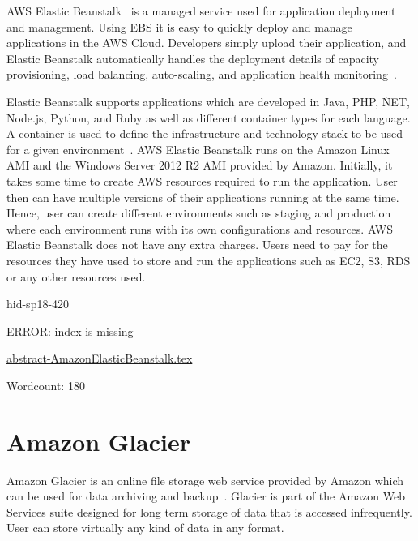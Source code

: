 AWS Elastic Beanstalk~\cite{hid-sp18-420-amazon-elastic-beanstalk} is a managed
service used for application deployment and management. Using EBS it is easy to
quickly deploy and manage applications in the AWS Cloud. Developers simply
upload their application, and Elastic Beanstalk automatically handles the
deployment details of capacity provisioning, load balancing, auto-scaling, and
application health monitoring~\cite{hid-sp18-420-amazon-elastic-beanstalk-FAQ}.

Elastic Beanstalk supports applications which are developed in Java, PHP, \.NET,
Node.js, Python, and Ruby as well as different container types for each
language. A container is used to define the infrastructure and technology stack
to be used for a given
environment~\cite{hid-sp18-420-amazon-elastic-beanstalk-FAQ}. AWS Elastic
Beanstalk runs on the Amazon Linux AMI and the Windows Server 2012 R2 AMI
provided by Amazon. Initially, it takes some time to create AWS resources
required to run the application. User then can have multiple versions of their
applications running at the same time. Hence, user can create different
environments such as staging and production where each environment runs with its
own configurations and resources. AWS Elastic Beanstalk does not have any extra
charges. Users need to pay for the resources they have used to store and run the
applications such as EC2, S3, RDS or any other resources used.


\begin{IU}

hid-sp18-420

ERROR: index is missing

\href{https://github.com/cloudmesh-community/hid-sp18-420/blob/master//technology/abstract-AmazonElasticBeanstalk.tex}{abstract-AmazonElasticBeanstalk.tex}

 

Wordcount: 180

\end{IU}

\section{Amazon Glacier}

Amazon Glacier is an online file storage web service provided by Amazon which
can be used for data archiving and backup~\cite{hid-sp18-420-Amazon-Glacier}.
Glacier is part of the Amazon Web Services suite designed for long term storage
of data that is accessed infrequently. User can store virtually any kind of data
in any format.

